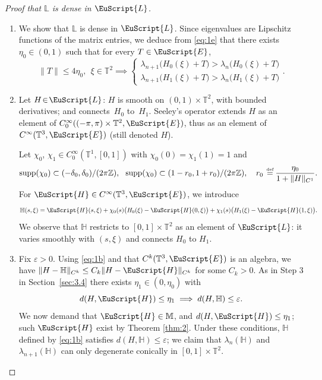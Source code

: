 \documentclass[JEP,XML,SOM,Unicode,NoFloatCountersInSection]{cedram}
\let\pazocal\EuScript
\theoremstyle{definition}
\newcommand{\supp}{\mathrm{supp}}
\newcommand{\EE}{\pazocal{E}}
\newcommand{\LL}{{\pazocal{L}}}
\newcommand{\HH}{\pazocal{H}}
\newcommand{\Hh}{{\mathbb{H}}}
\newcommand{\Ll}{\mathbb{L}}
\newcommand{\Mm}{\mathbb{M}}
\newcommand{\Z}{\mathbb{Z}}
\newcommand{\Tt}{{\mathbb{T}}}
\let\epsi\varepsilon
\newcommand{\systeme}[1]{\left\{ \begin{matrix} #1 \end{matrix}\right.}
\newcommand{\de}{\,\mathrel{\stackrel{\makebox[0pt]{\mbox{\normalfont\tiny def}}}{=}}}
\begin{document}
\skpt
\begin{proof}[Proof that $\Ll$ is dense in $\LL$]
\begin{enumerate}
\item
We show that $\Ll$ is dense in $\LL$.
Since eigenvalues are Lipschitz functions of the matrix entries, we deduce from \eqref{eq:1e} that there exists $\eta_0 \in (0,1)$ such that for every $T \in \EE$,
\begin{equation}\label{eq:2a}
\| T \| \leq 4\eta_0, \ \ \xi \in \Tt^2 \implies \systeme{
\lambda_{n+1}\bigl(H_0(\xi)+T\bigr) > \lambda_n\bigl(H_0(\xi)+T\bigr)
\\[5pt]
\lambda_{n+1}\bigl(H_1(\xi)+T\bigr) > \lambda_n\bigl(H_1(\xi)+T\bigr)}.
\end{equation}

\item
Let $H\!\in\!\LL$: $H$ is smooth on $(0,1)\!\times\!\Tt^2$, with bounded derivatives; and connects~$H_0$ to~$H_1$. Seeley's operator \cite{S65} extends $H$ as an element of \hbox{$C_0^\infty((-\pi,\pi) \times \Tt^2,\EE)$}, thus as an element of $C^\infty(\Tt^3,\EE)$ (still denoted $H$).

Let $\chi_0$, $\chi_1 \in C_0^\infty(\Tt^1,[0,1])$ with $\chi_0(0) = \chi_1(1) = 1$ and
\begin{equation*}
\supp(\chi_0) \subset (-\delta_0,\delta_0)/(2\pi \Z), \ \ \supp(\chi_0) \subset (1-r_0,1+r_0)/(2\pi \Z), \quad r_0 \de \dfrac{\eta_0}{1+\| H \|_{C^1}}.
\end{equation*}
For $\HH \in C^\infty(\Tt^3,\EE)$, we introduce
\begin{equation}\label{eq:1b}
\Hh(s,\xi) = \HH(s,\xi) + \chi_0(s) \bigl( H_0(\xi) - \HH(0,\xi) \bigr) + \chi_1(s) \bigl( H_1(\xi) - \HH(1,\xi) \bigr).
\end{equation}
We observe that $\Hh$ restricts to $[0,1] \times \Tt^2$ as an element of $\LL$: it varies smoothly with $(s,\xi)$ and connects $H_0$ to $H_1$.

\item
Fix $\epsi > 0$. Using \eqref{eq:1b} and that $C^k(\Tt^3,\EE)$ is an algebra, we have $\| H -\Hh \|_{C^k} \leq C_k \| H -\HH \|_{C^k}$ for some $C_k > 0$. As in Step 3 in Section~\ref{sec:3.4} there exists $\eta_1 \in (0,\eta_0)$ with
\begin{equation*}
d(H,\HH) \leq \eta_1 \implies d(H,\Hh) \leq \epsi.
\end{equation*}
We now demand that $\HH \in \Mm$, and $d(H,\HH) \leq \eta_1$; such $\HH$ exist by Theorem \ref{thm:2}. Under these conditions, $\Hh$ defined by \eqref{eq:1b} satisfies $d(H,\Hh) \leq \epsi$; we claim that $\lambda_n(\Hh)$ and $\lambda_{n+1}(\Hh)$ can only degenerate conically in $[0,1] \times \Tt^2$.


\end{enumerate}
\end{proof}
\end{document}
